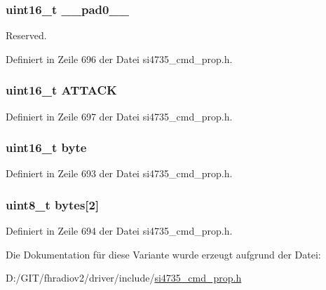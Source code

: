 \subsubsection[{\+\_\+\+\_\+pad0\+\_\+\+\_\+}]{\setlength{\rightskip}{0pt plus 5cm}uint16\+\_\+t \+\_\+\+\_\+pad0\+\_\+\+\_\+}\label{unionfm__soft__mute__atk__rate_a77132c2c26a75f5b8751b235cda23828}


Reserved. 



Definiert in Zeile 696 der Datei si4735\+\_\+cmd\+\_\+prop.\+h.

\hypertarget{unionfm__soft__mute__atk__rate_a23a6aee9d921440c53996214126047a3}{}
\subsubsection[{A\+T\+T\+A\+C\+K}]{\setlength{\rightskip}{0pt plus 5cm}uint16\+\_\+t A\+T\+T\+A\+C\+K}\label{unionfm__soft__mute__atk__rate_a23a6aee9d921440c53996214126047a3}


Definiert in Zeile 697 der Datei si4735\+\_\+cmd\+\_\+prop.\+h.

\hypertarget{unionfm__soft__mute__atk__rate_ab0549c1b5ea980a02e7eab77e21fea49}{}
\subsubsection[{byte}]{\setlength{\rightskip}{0pt plus 5cm}uint16\+\_\+t byte}\label{unionfm__soft__mute__atk__rate_ab0549c1b5ea980a02e7eab77e21fea49}


Definiert in Zeile 693 der Datei si4735\+\_\+cmd\+\_\+prop.\+h.

\hypertarget{unionfm__soft__mute__atk__rate_a46e4c05d20a047ec169f60d3167e912e}{}
\subsubsection[{bytes}]{\setlength{\rightskip}{0pt plus 5cm}uint8\+\_\+t bytes\mbox{[}2\mbox{]}}\label{unionfm__soft__mute__atk__rate_a46e4c05d20a047ec169f60d3167e912e}


Definiert in Zeile 694 der Datei si4735\+\_\+cmd\+\_\+prop.\+h.



Die Dokumentation für diese Variante wurde erzeugt aufgrund der Datei\+:\begin{DoxyCompactItemize}
\item 
D\+:/\+G\+I\+T/fhradiov2/driver/include/\hyperlink{si4735__cmd__prop_8h}{si4735\+\_\+cmd\+\_\+prop.\+h}\end{DoxyCompactItemize}
